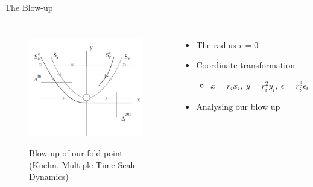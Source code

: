 \documentclass[11pt]{beamer}
\begin{document}
\begin{frame}{The Blow-up}
\begin{columns}
\begin{figure}
    \centering
    \includegraphics[height=5cm, width=5cm]{Blow_up.png}
    \caption{Blow up of our fold point (Kuehn, Multiple Time Scale Dynamics)}
\end{figure}
\begin{itemize}

\item The radius $r=0$
\item Coordinate transformation
\begin{itemize}
    \item $x=r_ix_i, \ y=r_i^2y_i, \ \epsilon=r_i^3\epsilon_i$\\
\end{itemize}
\item Analysing our blow up
\end{itemize}
\end{columns}
\end{frame}
\end{document}
